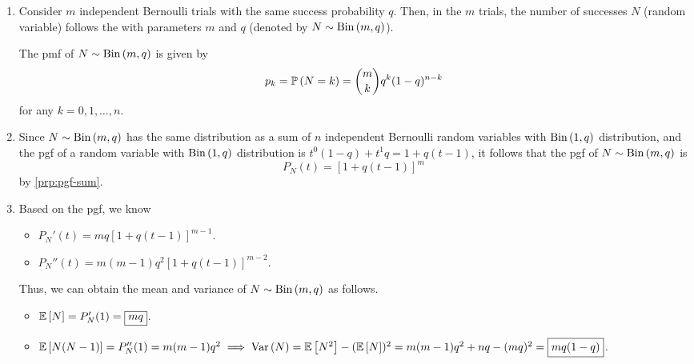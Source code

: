 \begin{enumerate}
\item Consider \(m\) independent Bernoulli trials with the same success
probability \(q\). Then, in the \(m\) trials, the number of successes \(N\)
(random variable) follows the  with parameters
\(m\) and \(q\) (denoted by \(N\sim\operatorname{Bin}\left(m,q\right)\)).

The pmf of \(N\sim\operatorname{Bin}\left(m,q\right)\) is given by
\[
p_k=\mathbb{P}\left(N=k\right)=\binom{m}{k}q^k(1-q)^{n-k}
\]
for any \(k=0,1,\dotsc,n\).

\item \label{it:bin-pgf}
Since \(N\sim\operatorname{Bin}\left(m,q\right)\) has the same distribution as a sum of \(n\)
independent Bernoulli random variables with \(\operatorname{Bin}\left(1,q\right)\) distribution, and the
pgf of a random variable with \(\operatorname{Bin}\left(1,q\right)\) distribution is
\(t^0(1-q)+t^1q=1+q(t-1)\), it follows that the pgf of \(N\sim\operatorname{Bin}\left(m,q\right)\) is
\[
P_N(t)=\boxed{[1+q(t-1)]^m}
\]
by \cref{prp:pgf-sum}.

\item \label{it:bin-mean-var}
Based on the pgf, we know
\begin{itemize}
\item \(P_N'(t)=mq[1+q(t-1)]^{m-1}\).
\item \(P_N''(t)=m(m-1)q^2[1+q(t-1)]^{m-2}\).
\end{itemize}

Thus, we can obtain the mean and variance of \(N\sim\operatorname{Bin}\left(m,q\right)\) as follows.
\begin{itemize}
\item \(\mathbb{E}\left[N\right]=P_N'(1)=\boxed{mq}\).
\item \(\mathbb{E}\left[N(N-1)\right]=P_N''(1)=m(m-1)q^2\implies
\operatorname{Var}\left(N\right)=\mathbb{E}\left[N^2\right]-(\mathbb{E}\left[N\right])^2
=m(m-1)q^2+nq-(mq)^2
=\boxed{mq(1-q)}\).
\end{itemize}
\end{enumerate}
